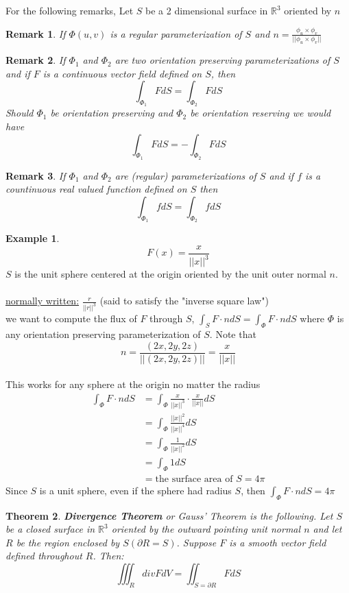 \documentclass[12pt]{article}
\theoremstyle{plain}
\newtheorem*{remark}{Remark}
\newtheorem{theorem}{Theorem}[section]
\theoremstyle{definition}
\newtheorem{example}[theorem]{Example}
\begin{document}
For the following remarks, Let $S$ be a 2 dimensional surface in $\mathbb{R}^3$ oriented by $n$
\begin{remark}
	If $\Phi (u,v)$ is a regular parameterization of $S$ and $n = \frac{\phi_u \times \phi_v}{||\phi_u \times \phi_v||}$
\end{remark}
\begin{remark}
	If $\Phi_1$ and $\Phi_2$ are two orientation preserving parameterizations of $S$ and if $F$ is a continuous vector field defined on $S$, then
	$$\int_{\Phi_1} F dS = \int_{\Phi_2} F dS$$
	Should $\Phi_1$ be orientation preserving and $\Phi_2$ be orientation reserving we would have
	$$\int_{\Phi_1} F dS = -\int_{\Phi_2} F dS$$
\end{remark}
\begin{remark}
	If $\Phi_1$ and $\Phi_2$ are (regular) parameterizations of $S$ and if $f$ is a countinuous real valued function defined on $S$ then
	$$\int_{\Phi_1} f dS = \int_{\Phi_2} f dS$$
\end{remark}

\begin{example}
	$$F(x) = \frac{x}{||x||^3}$$
	$S$ is the unit sphere centered at the origin oriented by the unit outer normal $n$.\\
	\\
	\underline{normally written:} $\frac{r}{||r||^3}$ (said to satisfy the "inverse square law")\\
	we want to compute the flux of $F$ through $S$, $\int_S F \cdot n dS = \int_\Phi F \cdot n dS$ where $\Phi$ is any orientation preserving parameterization of $S$. Note that $$n = \frac{(2x,2y,2z)}{||(2x,2y,2z)||} = \frac{x}{||x||}$$\\
	This works for any sphere at the origin no matter the radius\\
	\begin{align*}
		\int_\Phi F \cdot n dS &= \int_\Phi \frac{x}{||x||^3}\cdot \frac{x}{||x||} dS\\
		&= \int_\Phi \frac{||x||^2}{||x||^4} dS\\
		&= \int_\Phi \frac{1}{||x||^2} dS\\
		&= \int_\Phi 1 dS\\
		&= \text{the surface area of $S$} = 4\pi
	\end{align*}
	Since $S$ is a unit sphere, even if the sphere had radius $S$, then $\int_\Phi F \cdot n dS = 4\pi$
\end{example}

\begin{theorem}
	\textbf{Divergence Theorem} or Gauss' Theorem is the following. Let $S$ be a closed surface in $\mathbb{R}^3$ oriented by the outward pointing unit normal $n$ and let $R$ be the region enclosed by $S (\partial R = S)$. Suppose $F$ is a smooth vector field defined throughout $R$. Then:
	$$\iiint_R div F dV = \iint_{S=\partial R} F dS$$
\end{theorem}
\end{document}
